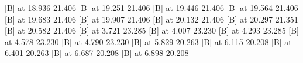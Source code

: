 {%
 [B] at 18.936 21.406
%
%
 [B] at 19.251 21.406
%
%
 [B] at 19.446 21.406
%
%
 [B] at 19.564 21.406
%
%
 [B] at 19.683 21.406
%
%
 [B] at 19.907 21.406
%
%
 [B] at 20.132 21.406
%
%
 [B] at 20.297 21.351
%
%
 [B] at 20.582 21.406
%
%
 [B] at  3.721 23.285
%
%
 [B] at  4.007 23.230
%
%
 [B] at  4.293 23.285
%
%
 [B] at  4.578 23.230
%
%
 [B] at  4.790 23.230
%
%
 [B] at  5.829 20.263
%
%
 [B] at  6.115 20.208
%
%
 [B] at  6.401 20.263
%
%
 [B] at  6.687 20.208
%
%
 [B] at  6.898 20.208
%
%
}

